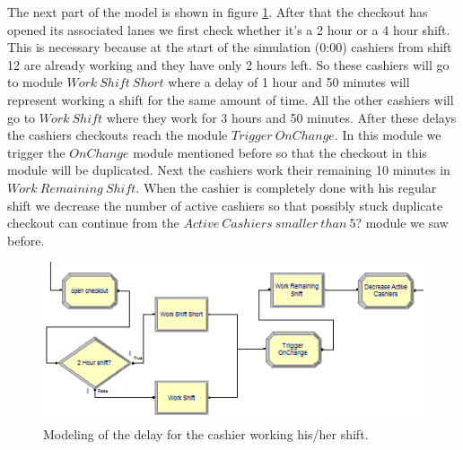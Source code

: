 The next part of the model is shown in figure \ref{fig:workshift}. After that the checkout has opened its associated lanes we first check whether it's a 2 hour or a 4 hour shift. This is necessary because at the start of the simulation (0:00) cashiers from shift 12 are already working and they have only 2 hours left. So these cashiers will go to module $Work \ Shift \ Short$ where a delay of 1 hour and 50 minutes will represent working a shift for the same amount of time. All the other cashiers will go to $Work \ Shift$ where they work for 3 hours and 50 minutes. After these delays the cashiers checkouts reach the module $Trigger \ OnChange$. In this module we trigger the $OnChange$ module mentioned before so that the checkout in this module will be duplicated. Next the cashiers work their remaining 10 minutes in $Work \ Remaining \ Shift$. When the cashier is completely done with his regular shift we decrease the number of active cashiers so that possibly stuck duplicate checkout can continue from the $Active \ Cashiers \ smaller \ than \ 5?$ module we saw before.

\begin{figure}[]
\begin{center}
	\includegraphics[scale=1]{images/model-description/work-shift.PNG}
	\caption{Modeling of the delay for the cashier working his/her shift.}
	\label{fig:workshift}
\end{center}
\end{figure}

